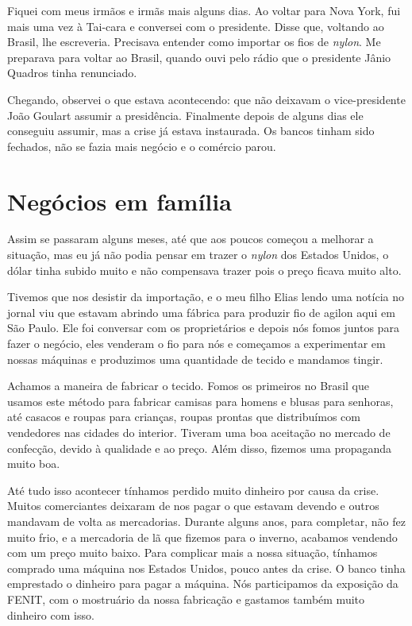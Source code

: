 Fiquei com meus irmãos e irmãs mais alguns dias. Ao voltar para Nova York, 
fui mais uma vez à Tai-cara e conversei com o presidente. Disse que,  
voltando ao Brasil, lhe escreveria. Precisava entender como importar os fios de \textit{nylon}. Me preparava para voltar ao Brasil, quando ouvi pelo rádio que o presidente Jânio
Quadros tinha renunciado.

Chegando, observei o que estava acontecendo: que não
deixavam o vice-presidente João Goulart assumir a presidência. 
Finalmente depois de alguns dias ele conseguiu assumir, mas a crise já estava instaurada. Os bancos tinham sido fechados, não se fazia mais negócio e o comércio parou.

\chapter{Negócios em família}

Assim se passaram alguns meses, até que aos poucos começou a melhorar a
situação, mas eu já não podia pensar em trazer o \textit{nylon} dos Estados
Unidos, o dólar tinha subido muito e não compensava trazer pois o preço
ficava muito alto.

Tivemos que nos desistir da importação, e o meu filho Elias lendo uma
notícia no jornal viu que estavam abrindo uma fábrica para produzir fio
de agilon aqui em São Paulo. Ele foi conversar com os proprietários e
depois nós fomos juntos para fazer o negócio, eles venderam o fio para
nós e começamos a experimentar em nossas máquinas e produzimos uma
quantidade de tecido e mandamos tingir.

Achamos a maneira de fabricar o tecido. Fomos os primeiros no Brasil que
usamos este método para fabricar camisas para homens e blusas para
senhoras, até casacos e roupas para crianças, roupas prontas que
distribuímos com vendedores nas cidades do interior. Tiveram uma boa
aceitação no mercado de confecção, devido à qualidade e ao preço. Além
disso, fizemos uma propaganda muito boa.

Até tudo isso acontecer tínhamos perdido muito dinheiro por causa da
crise. Muitos comerciantes deixaram de nos pagar o que estavam devendo e
outros mandavam de volta as mercadorias. Durante alguns anos, para
completar, não fez muito frio, e a mercadoria de lã que fizemos para o
inverno, acabamos vendendo com um preço muito baixo. Para complicar mais
a nossa situação, tínhamos comprado uma máquina nos Estados Unidos,
pouco antes da crise. O banco tinha emprestado o dinheiro para pagar a
máquina. Nós participamos da exposição da FENIT, com o mostruário da
nossa fabricação e gastamos também muito dinheiro com isso.


